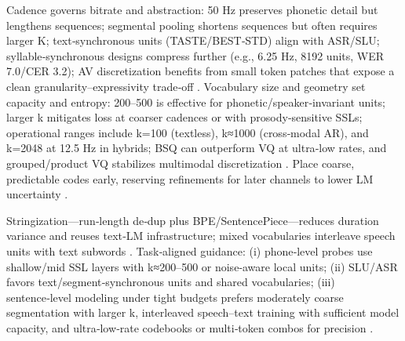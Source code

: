 \documentclass{article}
\begin{document}
Cadence governs bitrate and abstraction: 50 Hz preserves phonetic detail but lengthens sequences; segmental pooling shortens sequences but often requires larger K; text‑synchronous units (TASTE/BEST‑STD) align with ASR/SLU; syllable‑synchronous designs compress further (e.g., 6.25 Hz, 8192 units, WER 7.0/CER 3.2); AV discretization benefits from small token patches that expose a clean granularity–expressivity trade‑off \cite{kando2025exploringeffectsegmentationvocabularysiz,tseng2025tastetextalignedspeechtokenizationembedd,baade2024syllablelmlearningcoarsesemanticunitsspe,sadok2025vectorquantizedmaskedautoencoderaudiovis}. Vocabulary size and geometry set capacity and entropy: 200–500 is effective for phonetic/speaker‑invariant units; larger k mitigates loss at coarser cadences or with prosody‑sensitive SSLs; operational ranges include k=100 (textless), k≈1000 (cross‑modal AR), and k=2048 at 12.5 Hz in hybrids; BSQ can outperform VQ at ultra‑low rates, and grouped/product VQ stabilizes multimodal discretization \cite{chang2024dcspinspeakerinvariantspeechtokenizerspo,onda2025benchmarkingprosodyencodingdiscretespeec,hsu2024exploringcontextlearningtextlessspeechla,wu2024speechcomposerunifyingmultiplespeechtask,yang2025diffsoundstreamefficientspeechtokenizati,wang2025tadicodectextawarediffusionspeechtokeniz,sadok2025vectorquantizedmaskedautoencoderaudiovis}. Place coarse, predictable codes early, reserving refinements for later channels to lower LM uncertainty \cite{guo2025recentadvancesdiscretespeechtokensreview}.

Stringization—run‑length de‑dup plus BPE/SentencePiece—reduces duration variance and reuses text‑LM infrastructure; mixed vocabularies interleave speech units with text subwords \cite{guo2025recentadvancesdiscretespeechtokensreview,wu2024speechcomposerunifyingmultiplespeechtask,hsu2024exploringcontextlearningtextlessspeechla}. Task‑aligned guidance: (i) phone‑level probes use shallow/mid SSL layers with k≈200–500 or noise‑aware local units; (ii) SLU/ASR favors text/segment‑synchronous units and shared vocabularies; (iii) sentence‑level modeling under tight budgets prefers moderately coarse segmentation with larger k, interleaved speech–text training with sufficient model capacity, and ultra‑low‑rate codebooks or multi‑token combos for precision \cite{visser2025spokenlanguagemodelingdurationpenalizeds,gong2025xytokenizermitigatingsemanticacousticcon,kando2025exploringeffectsegmentationvocabularysiz,maimon2025scalinganalysisinterleavedspeechtextlang,zhang2025impactframeratesspeechtokenizercasestudy}.
\end{document}
